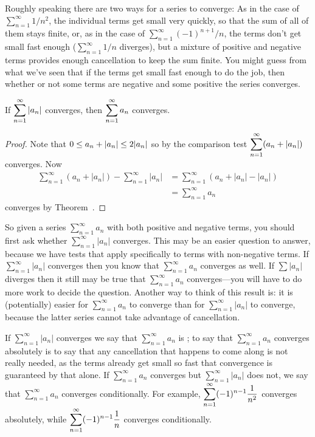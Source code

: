 
\nobreak
Roughly speaking there are two ways for a series to converge: As in
the case of $\sum_{n=1}^\infty 1/n^2$, the individual terms get small very quickly,
so that the sum of all of them stays finite, or, as in the case of
$\sum_{n=1}^\infty (-1)^{n+1}/n$, the terms don't get small fast enough ($\sum_{n=1}^\infty 1/n$
diverges), but a mixture of positive and negative terms provides
enough cancellation to keep the sum finite. You might guess from what
we've seen that if the terms get small fast enough to do the job, then
whether or not some terms are negative and some positive the series
converges. 

\begin{theorem}\label{thm:absolute-convergence-implies-convergence}
If $\displaystyle\sum_{n=1}^\infty |a_n|$ converges, then 
$\displaystyle\sum_{n=1}^\infty a_n$ converges.
\end{theorem}
\begin{proof}
Note that $\displaystyle 0\le a_n+|a_n|\le 2|a_n|$ so by the comparison test
$\displaystyle\sum_{n=1}^\infty (a_n+|a_n|)$ converges. Now
\begin{align*}
  \sum_{n=1}^\infty (a_n+|a_n|) -\sum_{n=1}^\infty |a_n|
  &= \sum_{n=1}^\infty \left( a_n+|a_n|-|a_n| \right) \\
  &= \sum_{n=1}^\infty a_n 
\end{align*}
converges by Theorem~.
\end{proof}

So given a series $\sum_{n=1}^\infty a_n$ with both positive and negative terms,
you should first ask whether $\sum_{n=1}^\infty |a_n|$ converges. This may be an
easier question to answer, because we have tests that apply
specifically to terms with non-negative terms. If $\sum_{n=1}^\infty |a_n|$
converges then you know that $\sum_{n=1}^\infty a_n$ converges as well. If $\sum
|a_n|$ diverges then it still may be true that $\sum_{n=1}^\infty a_n$
converges---you will have to do more work to decide the question.
Another way to think of this result is: it is (potentially) easier for
$\sum_{n=1}^\infty a_n$ to converge than for $\sum_{n=1}^\infty |a_n|$ to converge, because the
latter series cannot take advantage of cancellation. 


If $\sum_{n=1}^\infty |a_n|$ converges we say that $\sum_{n=1}^\infty a_n$ is
; to say that $\sum_{n=1}^\infty a_n$ converges absolutely is to
say that any cancellation that happens to come along is not really
needed, as the terms already get small so fast that convergence is
guaranteed by that alone. If $\sum_{n=1}^\infty a_n$ converges but $\sum_{n=1}^\infty |a_n|$
does not, we say that $\sum_{n=1}^\infty a_n$ converges {\dfont
  conditionally}. For example,
$\displaystyle\sum_{n=1}^\infty (-1)^{n-1} {1\over n^2}$ converges absolutely,
while $\displaystyle\sum_{n=1}^\infty (-1)^{n-1} {1\over n}$ converges
conditionally.


